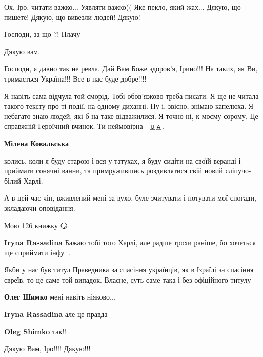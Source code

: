 
Ох, Іро, читати важко... Уявляти важко(( Яке пекло, який жах... Дякую, що пишете! Дякую, що вивезли людей! Дякую!


Господи, за що ?! Плачу


Дякую вам.


Господи, я давно так не ревла. Дай Вам Боже здоров'я, Ірино!!! На таких, як Ви,
тримається Україна!!! Все в нас буде добре!!!!


Я навіть сама відчула той сморід. Тобі обов'язково треба писати. Я ще не читала
такого тексту про ті події, на одному диханні. Ну і, звісно, знімаю капелюха. Я
небагато знаю людей, які б на таке відважилися. Я точно ні, к моєму сорому. Це
справжній Героїчний вчинок. Ти неймовірна ✊🏻🇺🇦.

\begin{itemize} %
\textbf{Мілена Ковальська} 

колись, коли я буду старою і вся у татухах, я буду сидіти на своїй веранді і
приймати сонячні ванни, та примружившись роздивлятися свій новий сліпучо-білий
Харлі.

А в цей час чіп, вживлений мені за вухо, буле зчитувати і нотувати мої спогади,
зкладаючи оповідання.

Мою 126 книжку 😏

\textbf{Iryna Rassadina} Бажаю тобі того Харлі, але радше трохи раніше, бо хочеться ще сприймати інфу 🤣.
\end{itemize} %


Якби у нас був титул Праведника за спасіння українців, як в Ізраїлі за спасіння
євреїв, то це саме той випадок. Власне, суть саме така і без офіційного титулу

\begin{itemize} %
\textbf{Олег Шимко} мені навіть ніяково...

\textbf{Iryna Rassadina} але це правда

\textbf{Oleg Shimko} так!!

Дякую Вам, Іро!!!! Дякую!!!
\end{itemize} %

